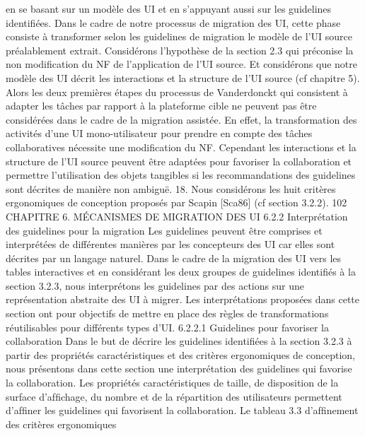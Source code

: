 \documentclass{article}
\begin{document}
en se basant sur un mod\`{e}le des UI et en s’appuyant aussi sur les guidelines identiﬁ\'{e}es. Dans
le cadre de notre processus de migration des UI, cette phase consiste \`{a} transformer selon les
guidelines de migration le mod\`{e}le de l’UI source pr\'{e}alablement extrait.
Consid\'{e}rons l’hypoth\`{e}se de la section 2.3 qui pr\'{e}conise la non modiﬁcation du NF de l’application
de l’UI source. Et consid\'{e}rons que notre mod\`{e}le des UI d\'{e}crit les interactions et la structure de l’UI
source (cf chapitre 5). Alors les deux premi\`{e}res \'{e}tapes du processus de Vanderdonckt qui consistent
\`{a} adapter les t\^{a}ches par rapport \`{a} la plateforme cible ne peuvent pas \^{e}tre consid\'{e}r\'{e}es dans le cadre de
la migration assist\'{e}e. En effet, la transformation des activit\'{e}s d’une UI mono-utilisateur pour prendre
en compte des t\^{a}ches collaboratives n\'{e}cessite une modiﬁcation du NF.
Cependant les interactions et la structure de l’UI source peuvent \^{e}tre adapt\'{e}es pour favoriser la
collaboration et permettre l’utilisation des objets tangibles si les recommandations des guidelines sont
d\'{e}crites de mani\`{e}re non ambigu\"{e}.
18. Nous consid\'{e}rons les huit crit\`{e}res ergonomiques de conception propos\'{e}s par Scapin [Sca86] (cf section 3.2.2).
102
CHAPITRE 6. MÉCANISMES DE MIGRATION DES UI
6.2.2
Interpr\'{e}tation des guidelines pour la migration
Les guidelines peuvent \^{e}tre comprises et interpr\'{e}t\'{e}es de diff\'{e}rentes mani\`{e}res par les concepteurs
des UI car elles sont d\'{e}crites par un langage naturel. Dans le cadre de la migration des UI vers les
tables interactives et en consid\'{e}rant les deux groupes de guidelines identiﬁ\'{e}s \`{a} la section 3.2.3, nous
interpr\'{e}tons les guidelines par des actions sur une repr\'{e}sentation abstraite des UI \`{a} migrer. Les interpr\'{e}tations propos\'{e}es dans cette section ont pour objectifs de mettre en place des r\`{e}gles de transformations r\'{e}utilisables pour diff\'{e}rents types d’UI.
6.2.2.1
Guidelines pour favoriser la collaboration
Dans le but de d\'{e}crire les guidelines identiﬁ\'{e}es \`{a} la section 3.2.3 \`{a} partir des propri\'{e}t\'{e}s caract\'{e}ristiques et des crit\`{e}res ergonomiques de conception, nous pr\'{e}sentons dans cette section une interpr\'{e}tation des guidelines qui favorise la collaboration. Les propri\'{e}t\'{e}s caract\'{e}ristiques de taille, de
disposition de la surface d’afﬁchage, du nombre et de la r\'{e}partition des utilisateurs permettent d’afﬁner
les guidelines qui favorisent la collaboration. Le tableau 3.3 d’afﬁnement des crit\`{e}res ergonomiques
\end{document}
